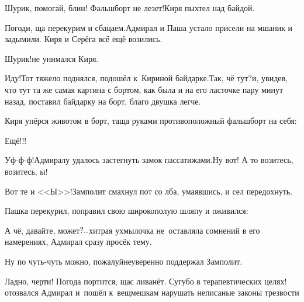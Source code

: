 \diagdash Шурик, помогай, блин! Фальшборт не лезет!\mdash Киря пыхтел над байдой.

\diagdash Погоди, ща перекурим и сбацаем.\mdash Адмирал и Паша устало присели на мшаник и задымили. Киря и Серёга всё ещё возились. 

\diagdash Шурик!\mdash не унимался Киря.

\diagdash Иду!\mdash Тот тяжело поднялся, подошёл к~Кириной байдарке.\mdash Так, чё тут?\mdash и, увидев, что тут та же самая картина с бортом, как была и на его ласточке пару минут назад, поставил байдарку на борт, благо двушка легче. 

Киря упёрся животом в борт, таща руками противоположный фальшборт на себя:

\diagdash Ещё!!!

\diagdash Уф-ф-ф!\mdash Адмиралу удалось застегнуть замок пассатижами.\mdash Ну вот! А то возитесь, возитесь, ы!

\diagdash Вот те и <<Ы>>!\mdash Замполит смахнул пот со лба, умаявшись, и сел передохнуть.

Пашка перекурил, поправил свою широкополую шляпу и оживился:


\diagdash А чё, давайте, может$\quldots$\mdash хитрая ухмылочка не~оставляла сомнений в его намерениях, Адмирал сразу просёк тему.

\diagdash Ну по чуть-чуть можно, пожалуй\myldots{}\mdash неуверенно поддержал Замполит.


\diagdash Ладно, черти! Погода портится, щас ливанёт. Сугубо в терапевтических целях!\mdash отозвался Адмирал и~пошёл к~вещмешкам нарушать неписаные законы трезвости  

%
%

